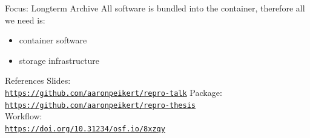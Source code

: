 \documentclass[12pt,t]{beamer}
\begin{document}
\begin{frame}[c]{Focus: Longterm Archive}
	\textcolor<2>{lolit}{All software is bundled into the container, therefore all we need is:}
	\begin{itemize}
		\item \textcolor<2>{lolit}{container software}
		\item \textcolor<2>{lolit}{storage infrastructure}
	\end{itemize}


\end{frame}


\begin{frame}[c]{References}
	\textcolor{lolit}{Slides:\\}\href{https://github.com/aaronpeikert/repro-talk}{\texttt{\textcolor{foreground}{https://github.com/aaronpeikert/repro-talk}}}
	\textcolor{lolit}{Package:\\}\href{https://github.com/aaronpeikert/repro-thesis}{\texttt{\textcolor{foreground}{https://github.com/aaronpeikert/repro-thesis}}}\\
	\textcolor{lolit}{Workflow:\\}\href{https://doi.org/10.31234/osf.io/8xzqy}{\texttt{\textcolor{foreground}{https://doi.org/10.31234/osf.io/8xzqy}}}
\end{frame}

\begin{frame}[c]
  \Huge
\end{frame}
\end{document}
